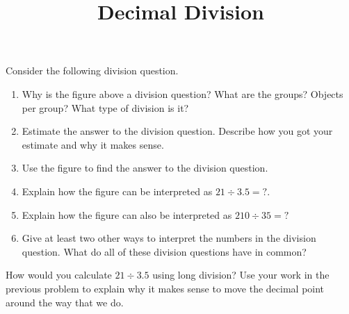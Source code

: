 \documentclass[nooutcomes,noauthor,handout]{ximera}
\title{Decimal Division}
\begin{document}
\begin{abstract} \end{abstract}
\maketitle


\begin{problem} Consider the following division question.
\begin{image}
\end{image}
\begin{enumerate}
\item Why is the figure above a division question? What are the groups? Objects per group? What type of division is it? 
\item Estimate the answer to the division question. Describe how you got your estimate and why it makes sense.
\item Use the figure to find the answer to the division question.
\item Explain how the figure can be interpreted as $21 \div 3.5 = ?$.
\item Explain how the figure can also be interpreted as $210 \div 35 = ?$
\item Give at least two other ways to interpret the numbers in the division question. What do all of these division questions have in common?
\end{enumerate}

\end{problem}

\begin{problem}
How would you calculate $21 \div 3.5$ using long division? Use your work in the previous problem to explain why it makes sense to move the decimal point around the way that we do.
\end{problem}
\end{document}
